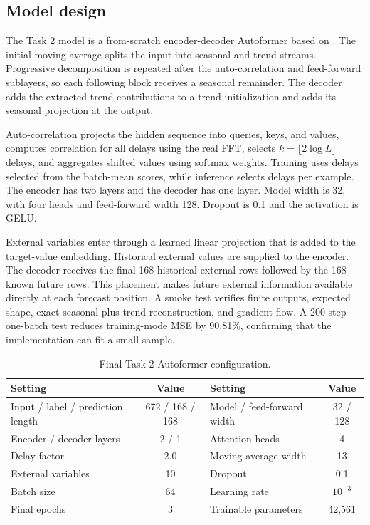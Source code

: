 \documentclass{article}
\newcommand{\pct}{\%}
\begin{document}
\subsection{Model design}

The Task 2 model is a from-scratch encoder-decoder Autoformer based on \citet{wu2021autoformer}. The initial moving average splits the input into seasonal and trend streams. Progressive decomposition is repeated after the auto-correlation and feed-forward sublayers, so each following block receives a seasonal remainder. The decoder adds the extracted trend contributions to a trend initialization and adds its seasonal projection at the output.

Auto-correlation projects the hidden sequence into queries, keys, and values, computes correlation for all delays using the real FFT, selects $k=\lfloor 2\log L\rfloor$ delays, and aggregates shifted values using softmax weights. Training uses delays selected from the batch-mean scores, while inference selects delays per example. The encoder has two layers and the decoder has one layer. Model width is 32, with four heads and feed-forward width 128. Dropout is 0.1 and the activation is GELU.

External variables enter through a learned linear projection that is added to the target-value embedding. Historical external values are supplied to the encoder. The decoder receives the final 168 historical external rows followed by the 168 known future rows. This placement makes future external information available directly at each forecast position. A smoke test verifies finite outputs, expected shape, exact seasonal-plus-trend reconstruction, and gradient flow. A 200-step one-batch test reduces training-mode MSE by 90.81\pct, confirming that the implementation can fit a small sample.

\begin{table}[htbp]
\centering
\caption{Final Task 2 Autoformer configuration.}
\label{tab:t2-config}
\footnotesize
\begin{tabular}{lc@{\qquad}lc}
\toprule
Setting & Value & Setting & Value \\
\midrule
Input / label / prediction length & 672 / 168 / 168 & Model / feed-forward width & 32 / 128 \\
Encoder / decoder layers & 2 / 1 & Attention heads & 4 \\
Delay factor & 2.0 & Moving-average width & 13 \\
External variables & 10 & Dropout & 0.1 \\
Batch size & 64 & Learning rate & $10^{-3}$ \\
Final epochs & 3 & Trainable parameters & 42,561 \\
\bottomrule
\end{tabular}
\end{table}
\end{document}
